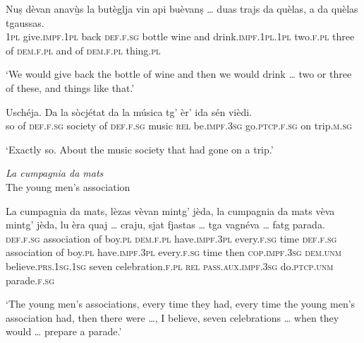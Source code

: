 \begin{linenumbers}
	\gll    Nuṣ dèvan anavù̱s la butèglja vin api buèvanṣ … duas trajs da quèlas, a da quèlas tgaussas.\\
	\textsc{1pl} give.\textsc{impf.1pl} back \textsc{def.f.sg} bottle wine and drink.\textsc{impf.1pl.1pl} {} two.\textsc{f.pl} three of \textsc{dem.f.pl} and of  \textsc{dem.f.pl} thing.\textsc{pl}\\
\end{linenumbers}
\medskip
\glt `We would give back the bottle of wine and then we would drink … two or three of these, and things like that.'
\medskip

\begin{linenumbers}
\gll    Uschéja. Da la sòcjétat da la música tg’ èr’ ida sén vièdi.\\
so of \textsc{def.f.sg} society of \textsc{def.f.sg} music \textsc{rel} be.\textsc{impf.3sg} go.\textsc{ptcp.f.sg} on trip.\textsc{m.sg}\\
\end{linenumbers}
\medskip
\glt `Exactly so. About the music society that had gone on a trip.'
\bigskip

\textit{La cumpagnia da mats}\\
The young men's association\\
\smallskip

\begin{linenumbers}
\gll    La cumpagnia da mats, lèzas vèvan mintg’ jèda, la cumpagnia da mats vèva mintg’ jèda, lu èra quaj … craju, sjat fjastas … tga vagnéva … fatg parada.\\
\textsc{def.f.sg} association of boy.\textsc{pl} \textsc{dem.f.pl} have.\textsc{impf.3pl} every.\textsc{f.sg} time \textsc{def.f.sg} association of boy.\textsc{pl} have.\textsc{impf.3pl} every.\textsc{f.sg} time then \textsc{cop.impf.3sg} \textsc{dem.unm} {} believe.\textsc{prs.1sg.1sg} seven celebration.\textsc{f.pl} {} \textsc{rel} \textsc{pass.aux.impf.3sg} {} do.\textsc{ptcp.unm} parade.\textsc{f.sg}\\
\end{linenumbers}
\medskip
\glt `The young men's associations, every time they had, every time the young men's association had, then there were …, I believe, seven celebrations … when they would … prepare a parade.'
\medskip


